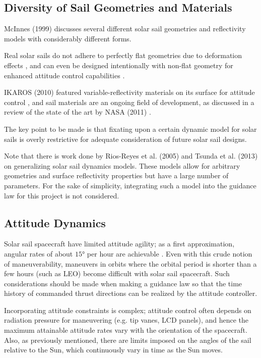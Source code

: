 \subsection{Diversity of Sail Geometries and Materials}
McInnes (1999) \cite{mcinnes} discusses several different solar sail geometries and reflectivity models with considerably different forms.

Real solar sails do not adhere to perfectly flat geometries due to deformation effects \cite{sakamoto2006effect}, and can even be designed intentionally with non-flat geometry for enhanced attitude control capabilities \cite{felicetti2016attitude}.

IKAROS (2010) featured variable-reflectivity materials on its surface for attitude control \cite{tsuda2013achievement}, and sail materials are an ongoing field of development, as discussed in a review of the state of the art by NASA (2011) \cite{johnson2011status}.

The key point to be made is that fixating upon a certain dynamic model for solar sails is overly restrictive for adequate consideration of future solar sail designs.

Note that there is work done by Rios-Reyes et al. (2005) \cite{rios2005generalized} and Tsunda et al. (2013) \cite{tsuda2013generalized} on generalizing solar sail dynamics models. These models allow for arbitrary geometries and surface reflectivity properties but have a large number of parameters. For the sake of simplicity, integrating such a model into the guidance law for this project is not considered.

\subsection{Attitude Dynamics}
Solar sail spacecraft have limited attitude agility; as a first approximation, angular rates of about \(\ang{15}\) per hour are achievable \cite{choi2015structural}. Even with this crude notion of maneuverability, maneuvers in orbits where the orbital period is shorter than a few hours (such as LEO) become difficult with solar sail spacecraft. Such considerations should be made when making a guidance law so that the time history of commanded thrust directions can be realized by the attitude controller.

Incorporating attitude constraints is complex; attitude control often depends on radiation pressure for maneuvering (e.g. tip vanes, LCD panels), and hence the maximum attainable attitude rates vary with the orientation of the spacecraft. Also, as previously mentioned, there are limits imposed on the angles of the sail relative to the Sun, which continuously vary in time as the Sun moves.

